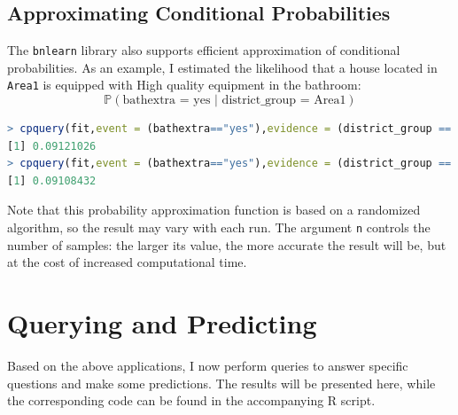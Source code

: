 \documentclass[15pt,a4paper]{report}
\begin{document}
\subsection*{Approximating Conditional Probabilities}
The \lstinline[language=R]|bnlearn| library also supports efficient approximation of conditional probabilities. As an example, I estimated the likelihood that a house located in \lstinline[language=R]|Area1| is equipped with High quality equipment in the bathroom:
\[
\mathbb{P}(\text{bathextra = yes | district\_group = Area1})
\]
\begin{lstlisting}[language=R]
> cpquery(fit,event = (bathextra=="yes"),evidence = (district_group == "Area1"),n=10^6)
[1] 0.09121026
> cpquery(fit,event = (bathextra=="yes"),evidence = (district_group == "Area1"),n=10^6)
[1] 0.09108432
\end{lstlisting}
Note that this probability approximation function is based on a randomized algorithm, so the result may vary with each run.
The argument \lstinline[language=R]|n|  controls the number of samples: the larger its value, the more accurate the result will be, but at the cost of increased computational time.

\section*{Querying and Predicting}
Based on the above applications, I now perform queries to answer specific questions and make some predictions. The results will be presented here, while the corresponding code can be found in the accompanying R script.
\end{document}
